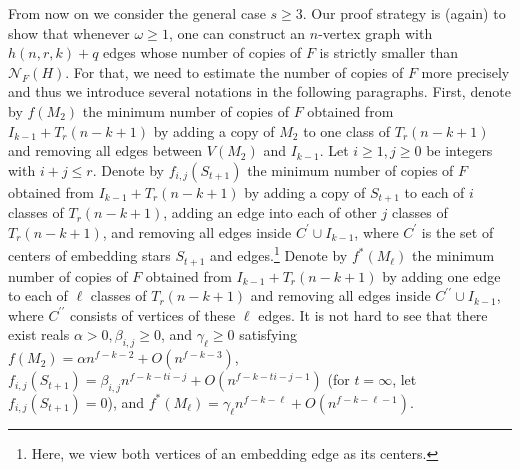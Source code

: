 \documentclass[10pt]{article}
\begin{document}
From now on we consider the general case $s\geq 3$.
Our proof strategy is (again) to show that whenever $\omega\geq 1$, one can construct an $n$-vertex graph with $h(n,r,k)+q$ edges whose number of copies of $F$ is strictly smaller than $\mathcal{N}_F(H)$.
For that, we need to estimate the number of copies of $F$ more precisely and thus we introduce several notations in the following paragraphs.
First, denote by $f(M_2)$ the minimum number of copies of $F$ obtained from $I_{k-1}+ T_r(n-k+1)$ by adding a copy of $M_2$ to one class of $T_r(n-k+1)$ and removing all edges between $V(M_2)$ and $I_{k-1}$.
Let $i\geq 1, j\geq 0$ be integers with $i+j\leq r$.
Denote by $f_{i,j}(S_{t+1})$ the minimum number of copies of $F$ obtained from $I_{k-1}+ T_r(n-k+1)$ by adding a copy of $S_{t+1}$ to each of $i$ classes of $T_r(n-k+1)$,
adding an edge into each of other $j$ classes of $T_r(n-k+1)$, and removing all edges inside $C^\prime\cup I_{k-1}$,
where $C^\prime$ is the set of centers of embedding stars $S_{t+1}$ and edges.\footnote{Here, we view both vertices of an embedding edge as its centers.}
Denote by $f^\ast(M_\ell)$ the minimum number of copies of $F$ obtained from $I_{k-1}+ T_r(n-k+1)$ by adding one edge to each of $\ell$ classes of $T_r(n-k+1)$ and removing all edges inside $C^{\prime\prime}\cup I_{k-1}$, where $C^{\prime\prime}$ consists of vertices of these $\ell$ edges.
It is not hard to see that there exist reals $\alpha>0, \beta_{i,j}\geq 0$, and $\gamma_\ell\geq 0$ satisfying $f(M_2)=\alpha n^{f-k-2}+O(n^{f-k-3})$, $f_{i,j}(S_{t+1})=\beta_{i,j} n^{f-k-ti-j}+O(n^{f-k-ti-j-1})$ (for $t= \infty$, let $f_{i,j}(S_{t+1})=0$), and $f^\ast(M_\ell)=\gamma_\ell n^{f-k-\ell}+O(n^{f-k-\ell-1})$.
\end{document}
